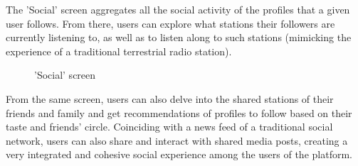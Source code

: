 The 'Social' screen aggregates all the social activity of the profiles that a given user follows. From there, users can explore what stations their followers are currently listening to, as well as to listen along to such stations (mimicking the experience of a traditional terrestrial radio station). 
\begin{figure}[htbp]
	\centering
	 \qquad
	 \qquad
	\caption{'Social' screen}
	\label{fig:mfp1}
\end{figure}

From the same screen, users can also delve into the shared stations of their friends and family and get recommendations of profiles to follow based on their taste and friends' circle. Coinciding with a news feed of a traditional social network, users can also share and interact with shared media posts, creating a very integrated and cohesive social experience among the users of the platform.

